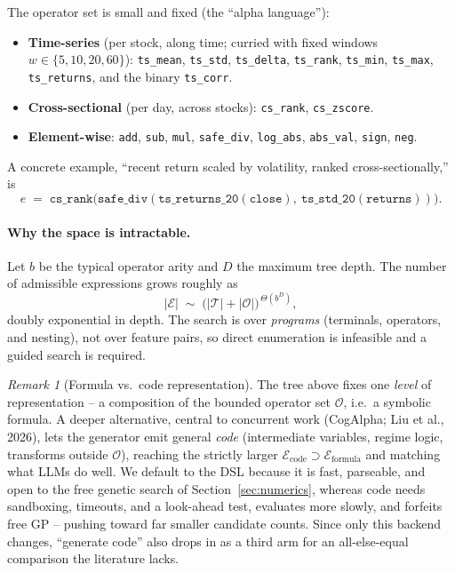 \documentclass[11pt]{article}
\theoremstyle{definition}
\theoremstyle{plain}
\theoremstyle{remark}
\newtheorem{remark}{Remark}[section]
\newcommand{\Expr}{\mathcal{E}}
\newcommand{\Term}{\mathcal{T}}
\newcommand{\Op}{\mathcal{O}}
\begin{document}
The operator set is small and fixed (the ``alpha language''):
\begin{itemize}[leftmargin=1.4em,itemsep=1pt]
  \item \textbf{Time-series} (per stock, along time; curried with fixed windows
  $w\in\{5,10,20,60\}$): \texttt{ts\_mean}, \texttt{ts\_std}, \texttt{ts\_delta},
  \texttt{ts\_rank}, \texttt{ts\_min}, \texttt{ts\_max}, \texttt{ts\_returns}, and the
  binary \texttt{ts\_corr}.
  \item \textbf{Cross-sectional} (per day, across stocks): \texttt{cs\_rank},
  \texttt{cs\_zscore}.
  \item \textbf{Element-wise}: \texttt{add}, \texttt{sub}, \texttt{mul},
  \texttt{safe\_div}, \texttt{log\_abs}, \texttt{abs\_val}, \texttt{sign},
  \texttt{neg}.
\end{itemize}
A concrete example, ``recent return scaled by volatility, ranked cross-sectionally,''
is
\[
e \;=\; \texttt{cs\_rank}\big(\texttt{safe\_div}(\texttt{ts\_returns\_20}(\texttt{close}),\ \texttt{ts\_std\_20}(\texttt{returns}))\big).
\]

\paragraph{Why the space is intractable.} Let $b$ be the typical operator arity and
$D$ the maximum tree depth. The number of admissible expressions grows roughly as
\begin{equation}
|\Expr| \;\sim\; \big(|\Term| + |\Op|\big)^{\,\Theta(b^{D})},
\label{eq:explosion}
\end{equation}
doubly exponential in depth. The search is over \emph{programs} (terminals, operators,
and nesting), not over feature pairs, so direct enumeration is infeasible and a guided
search is required.

\begin{remark}[Formula vs.\ code representation]
The tree above fixes one \emph{level} of representation -- a composition of the bounded operator
set $\Op$, i.e.\ a symbolic formula. A deeper alternative, central to concurrent work (CogAlpha;
Liu et al., 2026), lets the generator emit general \emph{code} (intermediate variables, regime
logic, transforms outside $\Op$), reaching the strictly larger
$\Expr_{\text{code}}\supset\Expr_{\text{formula}}$ and matching what LLMs do well. We default to
the DSL because it is fast, parseable, and open to the free genetic search of
Section~\ref{sec:numerics}, whereas code needs sandboxing, timeouts, and a look-ahead test,
evaluates more slowly, and forfeits free GP -- pushing toward far smaller candidate counts. Since
only this backend changes, ``generate code'' also drops in as a third arm for an all-else-equal
comparison the literature lacks.
\end{remark}
\end{document}
